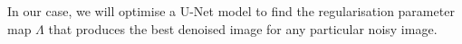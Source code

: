 \documentclass[12pt]{article}
\begin{document}
In our case, we will optimise a U-Net model to find the regularisation parameter map 
$\Lambda$ 
that produces the best denoised image for any particular noisy image.













\end{document}
